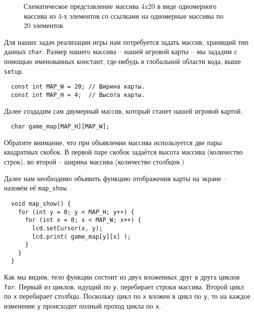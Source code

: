 \documentclass[../sparc.tex]{subfiles}
\begin{document}
\begin{figure}[ht]
  \centering
  \caption{Схематическое представление массива 4x20 в виде одномерного массива
    из 4-х элементов со ссылками на одномерные массивы по 20 элементов.}
  \label{fig:2d-array-example-with-references}
\end{figure}

Для наших задач реализации игры нам потребуется задать массив, хранящий тип
данных \texttt{char}.  Размер нашего массива -- нашей игровой карты -- мы
зададим с помощью именованных констант, где-нибудь в глобальной области кода,
выше \texttt{setup}.

\begin{verbatim}
  const int MAP_W = 20; // Ширина карты.
  const int MAP_H = 4;  // Высота карты.
\end{verbatim}

Далее создадим сам двумерный массив, который станет нашей игровой картой.

\begin{verbatim}
  char game_map[MAP_H][MAP_W];
\end{verbatim}

Обратите внимание, что при объявлении массива используется две пары квадратных
скобок.  В первой паре скобок задаётся высота массива (количество строк), во
второй -- ширина массива (количество столбцов.)

Далее нам необходимо объявить функцию отображения карты на экране -- назовём её
\texttt{map\_show}.

\begin{verbatim}
  void map_show() {
    for (int y = 0; y < MAP_H; y++) {
      for (int x = 0; x < MAP_W; x++) {
        lcd.setCursor(x, y);
        lcd.print( game_map[y][x] );
      }
    }
  }
\end{verbatim}

Как мы видим, тело функции состоит из двух вложенных друг в друга циклов
\texttt{for}.  Первый из циклов, идущий по \texttt{y}, перебирает строки
массива.  Второй цикл по \texttt{x} перебирает столбцы.  Поскольку цикл по
\texttt{x} вложен в цикл по \texttt{y}, то на каждое изменение \texttt{y}
происходит полный проход цикла по \texttt{x}.
\end{document}
